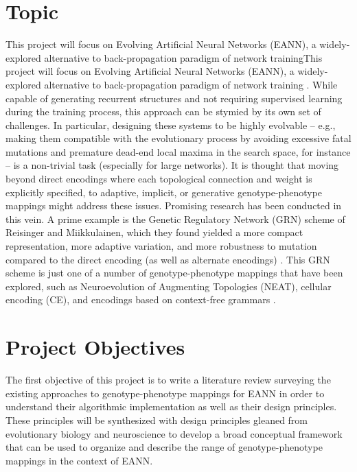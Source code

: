 \documentclass[a4paper]{article}
\begin{document}
\section{Topic}

 This project will focus on Evolving Artificial Neural Networks (EANN), a widely-explored alternative to back-propagation paradigm of network trainingThis project will focus on Evolving Artificial Neural Networks (EANN), a widely-explored alternative to back-propagation paradigm of network training \cite{DowningIntelligenceSystems}. While capable of generating recurrent structures and not requiring supervised learning during the training process, this approach can be stymied by its own set of challenges. In particular, designing these systems to be highly evolvable -- e.g., making them compatible with the evolutionary process by avoiding excessive fatal mutations and premature dead-end local maxima in the search space, for instance -- is a non-trivial task (especially for large networks). It is thought that moving beyond direct encodings where each topological connection and weight is explicitly specified, to adaptive, implicit, or generative genotype-phenotype mappings might address these issues. Promising research has been conducted in this vein. A prime example is the Genetic Regulatory Network (GRN) scheme of Reisinger and Miikkulainen, which they found yielded a more compact representation, more adaptive variation, and more robustness to mutation compared to the direct encoding (as well as alternate encodings) \cite{ReisingerAcquiringRepresentations}. This GRN scheme is just one of a number of genotype-phenotype mappings that have been explored, such as Neuroevolution of Augmenting Topologies (NEAT), cellular encoding (CE), and encodings based on context-free grammars \cite{DowningIntelligenceSystems}.


\section{Project Objectives}
The first objective of this project is to write a literature review surveying the existing approaches to genotype-phenotype mappings for EANN in order to understand their algorithmic implementation as well as their design principles. These principles will be synthesized with design principles gleaned from evolutionary biology and neuroscience to develop a broad conceptual framework that can be used to organize and describe the range of genotype-phenotype mappings in the context of EANN. 
\end{document}
